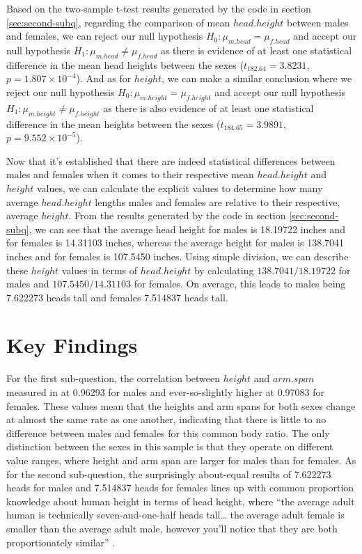 \documentclass[]{article}
\begin{document}
Based on the two-sample t-test results generated by the code in section
\ref{sec:second-subq}, regarding the comparison of mean \(head.height\)
between males and females, we can reject our null hypothesis
\(H_0: \mu_{m.head}=\mu_{f.head}\) and accept our null hypothesis
\(H_1: \mu_{m.head} \neq \mu_{f.head}\) as there is evidence of at least
one statistical difference in the mean head heights between the sexes
(\(t_{182.64}=3.8231\), \(p=1.807\times10^{-4}\)). And as for
\(height\), we can make a similar conclusion where we reject our null
hypothesis \(H_0: \mu_{m.height}=\mu_{f.height}\) and accept our null
hypothesis \(H_1: \mu_{m.height} \neq \mu_{f.height}\) as there is also
evidence of at least one statistical difference in the mean heights
between the sexes (\(t_{184.65}=3.9891\), \(p=9.552\times10^{-5}\)).

\vspace{0.25cm}

Now that it's established that there are indeed statistical differences
between males and females when it comes to their respective mean
\(head.height\) and \(height\) values, we can calculate the explicit
values to determine how many average \(head.height\) lengths males and
females are relative to their respective, average \(height\). From the
results generated by the code in section \ref{sec:second-subq}, we can
see that the average head height for males is 18.19722 inches and for
females is 14.31103 inches, whereas the average height for males is
138.7041 inches and for females is 107.5450 inches. Using simple
division, we can describe these \(height\) values in terms of
\(head.height\) by calculating \(138.7041/18.19722\) for males and
\(107.5450/14.31103\) for females. On average, this leads to males being
7.622273 heads tall and females 7.514837 heads tall.

\newpage

\section{Key Findings}
\label{sec:findings}

For the first sub-question, the correlation between \(height\) and
\(arm.span\) measured in at 0.96293 for males and ever-so-slightly
higher at 0.97083 for females. These values mean that the heights and
arm spans for both sexes change at almost the same rate as one another,
indicating that there is little to no difference between males and
females for this common body ratio. The only distinction between the
sexes in this sample is that they operate on different value ranges,
where height and arm span are larger for males than for females. As for
the second sub-question, the surprisingly about-equal results of
7.622273 heads for males and 7.514837 heads for females lines up with
common proportion knowledge about human height in terms of head height,
where ``the average adult human is technically seven-and-one-half heads
tall\ldots{} the average adult female is smaller than the average adult
male, however you'll notice that they are both proportionately similar''
\citep{Larson:2014}.
\end{document}
